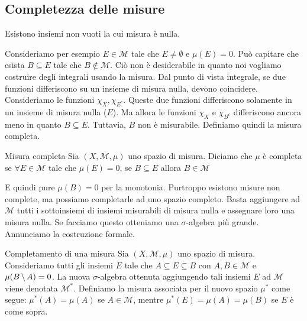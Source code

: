 \documentclass[a4paper]{article}
\begin{document}
\subsection{Completezza delle misure}

\begin{radioactive}
Esistono insiemi non vuoti la cui misura è nulla.

Consideriamo per esempio \(E \in \mathcal M\)
tale che \(E \neq \emptyset\) e \(\mu(E) = 0\).
Può capitare che esista \(B \subseteq E\) tale che \(B \notin \mathcal M\).
Ciò non è desiderabile in quanto
noi vogliamo costruire degli integrali usando la misura. Dal punto di vista integrale,
se due funzioni differiscono su un insieme di misura nulla, devono coincidere.
Consideriamo le funzioni
\(\chi_X, \chi_{E^c}\).
Queste due funzioni differiscono
solamente in un insieme di misura nulla (\(E\)).
Ma allora le funzioni \(\chi_X\) e \(\chi_{B^c}\)
differiscono ancora meno in quanto \(B \subseteq E\).
Tuttavia, \(B\) non è misurabile.
Definiamo quindi la misura completa.
\end{radioactive}

\begin{radioactive}
\begin{snippetdefinition}{Misura completa}
    Sia \((X, \mathcal M, \mu)\) uno spazio di misura.
    Diciamo che \(\mu\) è completa
    se \(\forall E \in \mathcal M\) tale che \(\mu(E) = 0\), se \(B \subseteq E\) allora \(B \in \mathcal M\)
\end{snippetdefinition}
\end{radioactive}

\begin{radioactive}
E quindi pure \(\mu(B) = 0\) per la monotonia.
Purtroppo esistono misure non complete, ma possiamo completarle ad uno spazio completo.
Basta aggiungere ad \(\mathcal M\) tutti i sottoinsiemi di insiemi misurabili di misura nulla e assegnare loro una misura nulla.
Se facciamo questo otteniamo una \(\sigma\)-algebra più grande.
Annunciamo la costruzione formale.
\end{radioactive}

\begin{radioactive}
\begin{snippetdefinition}{Completamento di una misura}
    Sia \((X, \mathcal M, \mu)\) uno spazio di misura.
    Consideriamo tutti gli insiemi \(E\)
    tale che \(A \subseteq E \subseteq B\)
    con \(A,B \in \mathcal M\) e \(\mu(B \,\backslash\, A) = 0\).
    La nuova \(\sigma\)-algebra ottenuta aggiungendo tali insiemi \(E\)
    ad \(\mathcal M\) viene denotata \(\mathcal M^*\).
    Definiamo la misura associata per il nuovo spazio \(\mu^*\)
    come segue: \(\mu^*(A) = \mu(A)\) se \(A\in \mathcal M\),
    mentre \(\mu^*(E) = \mu(A) = \mu(B)\) se \(E\) è come sopra.
\end{snippetdefinition}
\end{radioactive}
\end{document}
